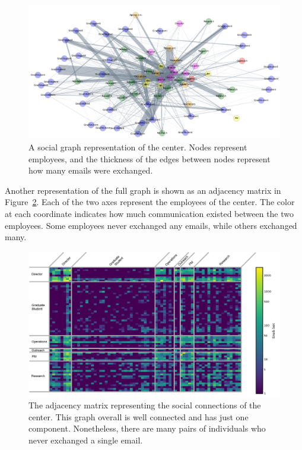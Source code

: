 \documentclass[12pt]{report}
\begin{document}
\begin{figure}[t]
    \centering
    \includegraphics[width=\columnwidth,trim={0mm 0mm 0mm 0mm},clip]{color_social_network}
    \vspace{-17pt}
    \caption[The social network of the center]{A social graph representation of the center.  Nodes represent employees, and the thickness of the edges between nodes represent how many emails were exchanged.}
    \label{fig:social_net}
\end{figure}

Another representation of the full graph is shown as an adjacency matrix in Figure~\ref{fig:adj_matrix}.
Each of the two axes represent the employees of the center.
The color at each coordinate indicates how much communication existed between the two employees.
Some employees never exchanged any emails, while others exchanged many.

\begin{figure}[t]
    \centering
    \includegraphics[width=1.05\columnwidth,trim={0mm 0mm 0mm 5mm},clip]{ViridisEdit}
    \vspace{-17pt}
    \caption[The dataset represented as an adjacency matrix]{The adjacency matrix representing the social connections of the center.  This graph overall is well connected and has just one component.  Nonetheless, there are many pairs of individuals who never exchanged a single email.}
    \label{fig:adj_matrix}
\end{figure}
\end{document}
